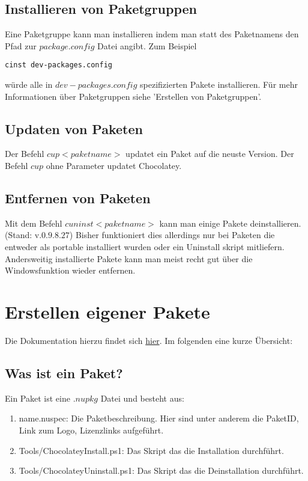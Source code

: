 \documentclass[10pt,a4paper]{article}
\begin{document}
\subsection{Installieren von Paketgruppen}
Eine Paketgruppe kann man installieren indem man statt des Paketnamens den Pfad zur $package.config$ Datei angibt.
Zum Beispiel 
\begin{lstlisting}
cinst dev-packages.config
\end{lstlisting} 
würde alle in $dev-packages.config$ spezifizierten Pakete installieren. Für mehr Informationen über Paketgruppen siehe 'Erstellen von Paketgruppen'.

\subsection{Updaten von Paketen}
Der Befehl $cup <paketname>$ updatet ein Paket auf die neuste Version. Der Befehl $cup$ ohne Parameter updatet Chocolatey.

\subsection{Entfernen von Paketen}
Mit dem Befehl $cuninst <paketname>$ kann man einige Pakete deinstallieren. (Stand: v.$0.9.8.27$) Bisher funktioniert dies allerdings nur bei Paketen die entweder als portable installiert wurden oder ein Uninstall skript mitliefern. Andersweitig installierte Pakete kann man meist recht gut über die Windowsfunktion wieder entfernen.

\section{Erstellen eigener Pakete}
Die Dokumentation hierzu findet sich \href{https://github.com/chocolatey/chocolatey/wiki/CreatePackages}{hier}. Im folgenden eine kurze Übersicht:
\subsection{Was ist ein Paket?}
\label{sec:wasisteinpaket}
Ein Paket ist eine $.nupkg$ Datei und besteht aus:
\begin{enumerate}
\item name.nuspec: Die Paketbeschreibung. Hier sind unter anderem die PaketID, Link zum Logo, Lizenzlinks aufgeführt.
\item Tools/ChocolateyInstall.ps1: Das Skript das die Installation durchführt.
\item Tools/ChocolateyUninstall.ps1: Das Skript das die Deinstallation durchführt.
\end{enumerate}
\end{document}
